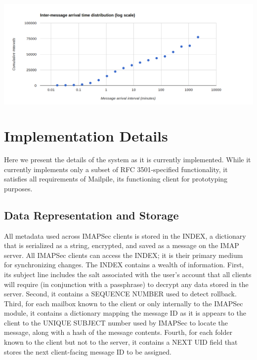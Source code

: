 \documentclass[pageno]{jpaper}
\newcommand{\project}{IMAPSec }
\begin{document}
\includegraphics[width=\textwidth]{intermessagelog}




\section{Implementation Details}

Here we present the details of the system as it is currently implemented. While it currently implements only a subset of RFC 3501-specified functionality, it satisfies all requirements of Mailpile, its functioning client for prototyping purposes.

\subsection{Data Representation and Storage}

All metadata used across \project clients is stored in the INDEX, a dictionary that is serialized as a string, encrypted, and saved as a message on the IMAP server. All \project clients can access the INDEX; it is their primary medium for synchronizing changes. The INDEX contains a wealth of information. First, its subject line includes the salt associated with the user's account that all clients will require (in conjunction with a passphrase) to decrypt any data stored in the server. Second, it contains a SEQUENCE NUMBER used to detect rollback. Third, for each mailbox known to the client or only internally to the \project module, it contains a dictionary mapping the message ID as it is appears to the client to the UNIQUE SUBJECT number used by \project to locate the message, along with a hash of the message contents. Fourth, for each folder known to the client but not to the server, it contains a NEXT UID field that stores the next client-facing message ID to be assigned.
\end{document}
